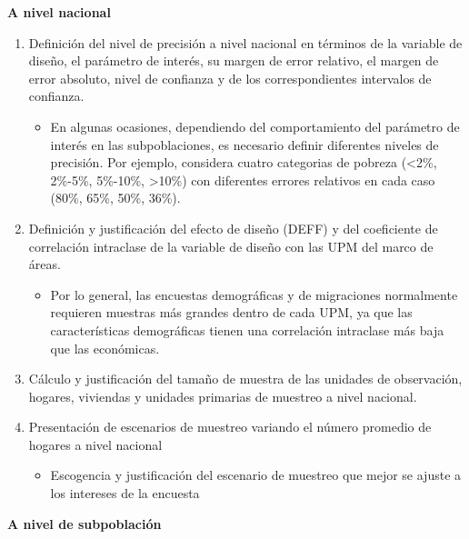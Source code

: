 \textbf{A nivel nacional}

\begin{enumerate}
\def\labelenumi{\arabic{enumi}.}
\tightlist
\item
  Definición del nivel de precisión a nivel nacional en términos de la variable de diseño, el parámetro de interés, su margen de error relativo, el margen de error absoluto, nivel de confianza y de los correspondientes intervalos de confianza.

  \begin{itemize}
  \tightlist
  \item
    En algunas ocasiones, dependiendo del comportamiento del parámetro de interés en las subpoblaciones, es necesario definir diferentes niveles de precisión. Por ejemplo, \citet{Caceres_2015} considera cuatro categorias de pobreza (\textless{}2\%, 2\%-5\%, 5\%-10\%, \textgreater{}10\%) con diferentes errores relativos en cada caso (80\%, 65\%, 50\%, 36\%).
  \end{itemize}
\item
  Definición y justificación del efecto de diseño (DEFF) y del coeficiente de correlación intraclase de la variable de diseño con las UPM del marco de áreas.

  \begin{itemize}
  \tightlist
  \item
    Por lo general, las encuestas demográficas y de migraciones normalmente
    requieren muestras más grandes dentro de cada UPM, ya que las características demográficas tienen una correlación intraclase más baja que las económicas.
  \end{itemize}
\item
  Cálculo y justificación del tamaño de muestra de las unidades de observación, hogares, viviendas y unidades primarias de muestreo a nivel nacional.
\item
  Presentación de escenarios de muestreo variando el número promedio de hogares a nivel nacional

  \begin{itemize}
  \tightlist
  \item
    Escogencia y justificación del escenario de muestreo que mejor se ajuste a los intereses de la encuesta
  \end{itemize}
\end{enumerate}

\textbf{A nivel de subpoblación}

